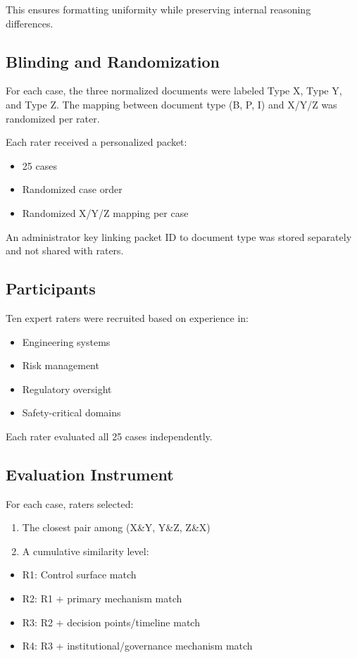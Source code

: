 This ensures formatting uniformity while preserving internal reasoning differences.

\subsection{Blinding and Randomization}

For each case, the three normalized documents were labeled Type X, Type Y, and Type Z. The mapping between document type (B, P, I) and X/Y/Z was randomized per rater.

Each rater received a personalized packet:
\begin{itemize}
    \item 25 cases
    \item Randomized case order
    \item Randomized X/Y/Z mapping per case
\end{itemize}

An administrator key linking packet ID to document type was stored separately and not shared with raters.

\subsection{Participants}

Ten expert raters were recruited based on experience in:
\begin{itemize}
    \item Engineering systems
    \item Risk management
    \item Regulatory oversight
    \item Safety-critical domains
\end{itemize}

Each rater evaluated all 25 cases independently.

\subsection{Evaluation Instrument}

For each case, raters selected:

\begin{enumerate}
    \item The closest pair among (X\&Y, Y\&Z, Z\&X)
    \item A cumulative similarity level:
\end{enumerate}

\begin{itemize}
    \item R1: Control surface match
    \item R2: R1 + primary mechanism match
    \item R3: R2 + decision points/timeline match
    \item R4: R3 + institutional/governance mechanism match
\end{itemize}

